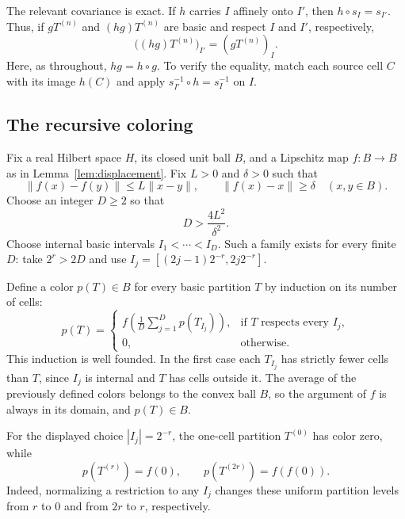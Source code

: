 \documentclass[11pt]{article}
\newcommand{\norm}[1]{\lVert #1\rVert}
\theoremstyle{definition}
\numberwithin{equation}{section}
\begin{document}
The relevant covariance is exact.  If $h$ carries $I$ affinely onto
$I'$, then $h\circ s_I=s_{I'}$.  Thus, if $gT^{(n)}$ and
$(hg)T^{(n)}$ are basic and respect $I$ and $I'$, respectively,
\begin{equation}\label{dyad:covariance}
  \bigl((hg)T^{(n)}\bigr)_{I'}=(gT^{(n)})_I.
\end{equation}
Here, as throughout, $hg=h\circ g$.  To verify the equality, match
each source cell $C$ with its image $h(C)$ and apply
$s_{I'}^{-1}\circ h=s_I^{-1}$ on $I$.

\subsection{The recursive coloring}\label{sec:coloring}

Fix a real Hilbert space $H$, its closed unit ball $B$, and a
Lipschitz map $f:B\to B$ as in Lemma~\ref{lem:displacement}.  Fix
$L>0$ and $\delta>0$ such that
\begin{equation}\label{color:map}
  \norm{f(x)-f(y)}\leq L\norm{x-y},\qquad
  \norm{f(x)-x}\geq\delta
  \quad(x,y\in B).
\end{equation}
Choose an integer $D\geq2$ so that
\begin{equation}\label{color:parameters}
  D>\frac{4L^2}{\delta^2}.
\end{equation}
Choose internal basic intervals $I_1<\cdots<I_D$.  Such a family
exists for every finite $D$: take $2^r>2D$ and use
$I_j=[(2j-1)2^{-r},2j2^{-r}]$.

Define a color $p(T)\in B$ for every basic partition $T$ by induction
on its number of cells:
\begin{equation}\label{color:recursion}
  p(T)=
  \begin{cases}
  \displaystyle f\left(\frac1D\sum_{j=1}^D p(T_{I_j})\right),
       &\text{if $T$ respects every $I_j$},\\[6pt]
  0,   &\text{otherwise}.
  \end{cases}
\end{equation}
This induction is well founded.  In the first case each $T_{I_j}$
has strictly fewer cells than $T$, since $I_j$ is internal and $T$
has cells outside it.  The average of the previously defined
colors belongs to the convex ball $B$, so the argument of $f$ is
always in its domain, and $p(T)\in B$.

For the displayed choice $|I_j|=2^{-r}$, the one-cell partition
$T^{(0)}$ has color zero, while
\[
  p(T^{(r)})=f(0),\qquad
  p(T^{(2r)})=f(f(0)).
\]
Indeed, normalizing a restriction to any $I_j$ changes these uniform
partition levels from $r$ to $0$ and from $2r$ to $r$, respectively.
\end{document}
